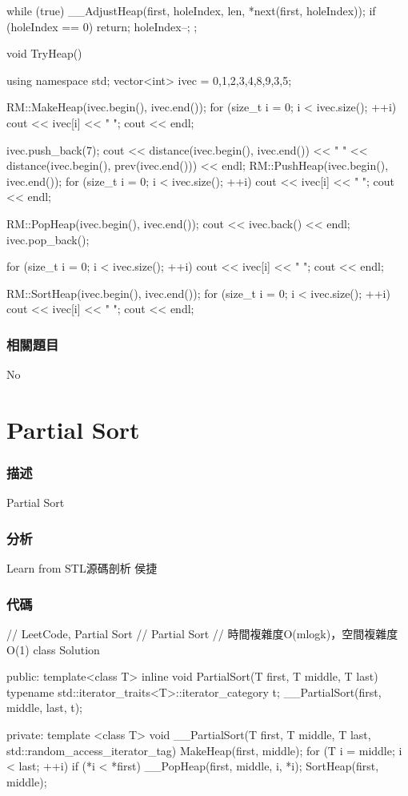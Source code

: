 \begin{Code}
{{        while (true)
        {
            __AdjustHeap(first, holeIndex, len, *next(first, holeIndex));
            if (holeIndex == 0) return;
            holeIndex--;
        }
    }
};

void TryHeap()
{
    using namespace std;
    vector<int> ivec = {0,1,2,3,4,8,9,3,5};

    RM::MakeHeap(ivec.begin(), ivec.end());
    for (size_t i = 0; i < ivec.size(); ++i)
        cout << ivec[i] << " ";
    cout << endl;

    ivec.push_back(7);
    cout << distance(ivec.begin(), ivec.end())
         << " " << distance(ivec.begin(), prev(ivec.end())) << endl;
    RM::PushHeap(ivec.begin(), ivec.end());
    for (size_t i = 0; i < ivec.size(); ++i)
        cout << ivec[i] << " ";
    cout << endl;

    RM::PopHeap(ivec.begin(), ivec.end());
    cout << ivec.back() << endl;
    ivec.pop_back();

    for (size_t i = 0; i < ivec.size(); ++i)
        cout << ivec[i] << " ";
    cout << endl;

    RM::SortHeap(ivec.begin(), ivec.end());
    for (size_t i = 0; i < ivec.size(); ++i)
        cout << ivec[i] << " ";
    cout << endl;
}
\end{Code}

\subsubsection{相關題目}
No

\section{Partial Sort} %
\label{sec:partial-sort}


\subsubsection{描述}
Partial Sort


\subsubsection{分析}
Learn from STL源碼剖析 侯捷


\subsubsection{代碼}
\begin{Code}
// LeetCode, Partial Sort
// Partial Sort
// 時間複雜度O(mlogk)，空間複雜度O(1)
class Solution {
public:
    template<class T>
    inline void PartialSort(T first, T middle, T last)
    {
        typename std::iterator_traits<T>::iterator_category t;
        __PartialSort(first, middle, last, t);
    }

private:
    template <class T>
        void __PartialSort(T first, T middle, T last, std::random_access_iterator_tag)
    {
        MakeHeap(first, middle);
        for (T i = middle; i < last; ++i)
        {
            if (*i < *first)
                __PopHeap(first, middle, i, *i);
        }
        SortHeap(first, middle);
    }
}
\end{Code}

